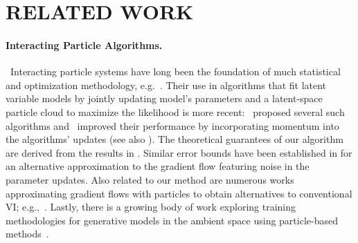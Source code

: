 \documentclass[twoside]{article}
\begin{document}
\section{RELATED WORK}\label{sec:rel_work}
\paragraph{Interacting Particle Algorithms.}~Interacting particle systems have long been the foundation of much  statistical and optimization methodology, e.g.~\citep{DelMoral2004, kennedy1995swarm}. Their use in algorithms that fit latent variable models by jointly updating model's parameters and a latent-space particle cloud to maximize the likelihood is more recent:~\citet{kuntz23a} proposed several such algorithms and~\citet{limMomentumParticleMaximum2024} improved their performance by incorporating momentum into the algorithms' updates (see also \cite{encinar2024proximalinteractingparticlelangevin,sharrock24a,oliva2024kineticinteractingparticlelangevin,marion2025implicitdiffusionefficientoptimization,akyildiz2025interacting,marks2025learninglatentenergybasedmodels}). 
The theoretical guarantees of our algorithm are derived from the results in \citet{caprioerrorboundsparticle2024}. Similar error bounds have been established in \citet{akyildiz2025interacting} for an alternative approximation to the gradient flow featuring noise in the parameter updates. Also related to our method are numerous works approximating gradient flows with particles to obtain alternatives to conventional \gls*{VI}; e.g.,~\citet{liuSteinVariationalGradient2016,lambertVariationalInferenceWasserstein2022,duncan23svgd, diao2023forwardbackwardgaussianvariationalinference, limParticleSemiimplicitVariational2024}. Lastly, there is a growing body of work exploring training methodologies for generative models in the ambient space using particle-based methods~\citep{arbel2019maximummeandiscrepancygradient,yiMonoFlowRethinkingDivergence2023,franceschiUnifyingGANsScorebased2023,galashovDeepMMDGradient2024,zhouInductiveMomentMatching2025}.
\end{document}
